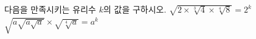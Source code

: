 다음을 만족시키는 유리수 $k$의 값을 구하시오.
 $\sqrt{2\times\sqrt[3]{4}\times\sqrt[4]{8}}=2^{k}$
 $\sqrt{a\sqrt{a\sqrt{a}}}\times\sqrt{\sqrt[4]{a}}=a^{k}$ 
